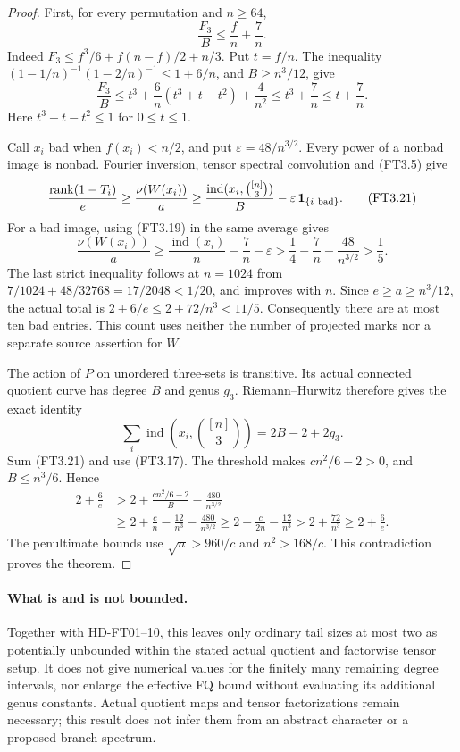 \begin{proof}
First, for every permutation and \(n\ge64\),
\[
 \frac{F_3}{B}\le \frac fn+\frac7n.
 \tag{FT3.19}
\]
Indeed \(F_3\le f^3/6+f(n-f)/2+n/3\).  Put \(t=f/n\).
The inequality
\((1-1/n)^{-1}(1-2/n)^{-1}\le1+6/n\), and \(B\ge n^3/12\),
give
\[
 \frac{F_3}{B}
 \le t^3+\frac6n(t^3+t-t^2)+\frac4{n^2}
 \le t^3+\frac7n\le t+\frac7n.
 \tag{FT3.20}
\]
Here \(t^3+t-t^2\le1\) for \(0\le t\le1\).

Call \(x_i\) bad when \(f(x_i)<n/2\), and put
\(\varepsilon=48/n^{3/2}\).  Every power of a nonbad image
is nonbad.  Fourier inversion, tensor spectral convolution and
(FT3.5) give
\[
 \frac{\operatorname{rank}(1-T_i)}e
 \ge\frac{\nu(W(x_i))}{a}
 \ge\frac{\operatorname{ind}(x_i,\binom{[n]}3)}B
                  -\varepsilon\,{\bf1}_{\{i\ {\rm bad}\}}.
 \tag{FT3.21}
\]
For a bad image, using (FT3.19) in the same average gives
\[
 \frac{\nu(W(x_i))}a
 \ge\frac{\operatorname{ind}(x_i)}n-\frac7n-\varepsilon
 >\frac14-\frac7n-\frac{48}{n^{3/2}}>\frac15.
 \tag{FT3.22}
\]
The last strict inequality follows at \(n=1024\) from
\(7/1024+48/32768=17/2048<1/20\), and improves with \(n\).
Since \(e\ge a\ge n^3/12\), the actual total is
\(2+6/e\le2+72/n^3<11/5\).
Consequently there are at most ten bad entries.
This count uses neither the number of projected marks nor a
separate source assertion for \(W\).

The action of \(P\) on unordered three-sets is transitive.
Its actual connected quotient curve has degree \(B\) and genus \(g_3\).
Riemann--Hurwitz therefore gives the exact identity
\[
 \sum_i\operatorname{ind}(x_i,\binom{[n]}3)=2B-2+2g_3.
 \tag{FT3.23}
\]
Sum (FT3.21) and use (FT3.17).  The threshold makes
\(cn^2/6-2>0\), and \(B\le n^3/6\).  Hence
\[
 \begin{split}
 2+\frac6e
 &>2+\frac{cn^2/6-2}{B}-\frac{480}{n^{3/2}}\\
 &\ge2+\frac cn-\frac{12}{n^3}-\frac{480}{n^{3/2}}
 \ge2+\frac{c}{2n}-\frac{12}{n^3}
 >2+\frac{72}{n^3}\ge2+\frac6e.
 \end{split}
 \tag{FT3.24}
\]
The penultimate bounds use
\(\sqrt n>960/c\) and \(n^2>168/c\).
This contradiction proves the theorem.
\end{proof}

\paragraph{What is and is not bounded.}
Together with HD-FT01--10, this leaves only ordinary tail sizes
at most two as potentially unbounded within the stated actual
quotient and factorwise tensor setup.  It does not give numerical
values for the finitely many remaining degree intervals, nor
enlarge the effective FQ bound without evaluating its additional
genus constants.  Actual quotient maps and tensor factorizations
remain necessary; this result does not infer them from an abstract
character or a proposed branch spectrum.
